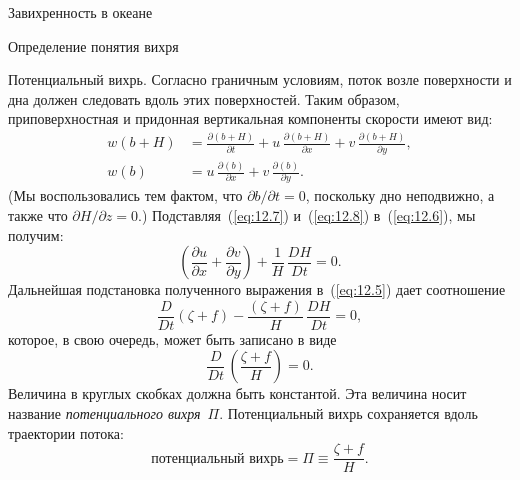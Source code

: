 \begin{chapter}{Завихренность в океане}
\begin{section}{Определение понятия вихря}
\begin{paragraph}{Потенциальный вихрь.}
Согласно граничным условиям, поток возле поверхности и дна должен следовать
вдоль этих поверхностей. Таким образом, приповерхностная и придонная 
вертикальная компоненты скорости имеют вид:
\begin{align}
w(b+H) &= \frac{\partial{(b+H)}}{\partial{t}} 
          + u\,\frac{\partial{(b+H)}}{\partial{x}}
          + v\, \frac{\partial{(b+H)}}{\partial{y}},\label{eq:12.7} \\
w(b)   &= u\,\frac{\partial{(b)}}{\partial{x}}
          + v\,\frac{\partial{(b)}}{\partial{y}}.\label{eq:12.8}
\end{align}
(Мы воспользовались тем фактом, что $\partial{b}/\partial{t} = 0$, поскольку
дно неподвижно, а также что $\partial{H}/\partial{z} = 0$.)
Подставляя~(\ref{eq:12.7}) и~(\ref{eq:12.8}) в~(\ref{eq:12.6}), мы получим:
\begin{displaymath}
 \left( \frac{\partial{u}}{\partial{x}} 
     + \frac{\partial{v}}{\partial{y}}\right) + \frac{1}{H}\,\frac{DH}{Dt} = 0.
\end{displaymath}
Дальнейшая подстановка полученного выражения в~(\ref{eq:12.5}) дает соотношение
\begin{displaymath}
\frac{D}{Dt}\left(\zeta +f  \right) 
 -\frac{\left(\zeta +f\right)}{H}\,\frac{DH}{Dt} = 0,
\end{displaymath}
которое, в свою очередь, может быть записано в виде
\begin{displaymath}
 \frac{D }{Dt}\,\left( \frac{\zeta + f}{H} \right) = 0.
\end{displaymath}
Величина в круглых скобках должна быть константой. Эта величина носит
название \emph{потенциального вихря}~$\Pi$. 
Потенциальный вихрь сохраняется вдоль траектории потока:
\begin{equation}\label{eq:12.9}
 \boxed{\text{потенциальный вихрь} = \Pi \equiv \frac{\zeta + f}{H}.}
\end{equation}
%

\end{paragraph}
\end{section}
\end{chapter}
